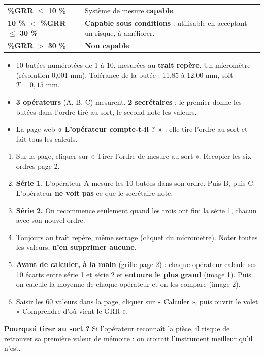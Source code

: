 \documentclass[10pt,a4paper]{article}
\begin{document}
\renewcommand{\arraystretch}{1.2}
\begin{tabularx}{\linewidth}{@{}l X@{}}
\toprule
\textcolor{ok}{\textbf{\%GRR $\le$ 10 \%}} & Système de mesure \textbf{capable}.\\
\textbf{10 \% $<$ \%GRR $\le$ 30 \%} & \textbf{Capable sous conditions} : utilisable en acceptant un risque, à améliorer.\\
\textcolor{ko}{\textbf{\%GRR $>$ 30 \%}} & \textbf{Non capable}.\\
\bottomrule
\end{tabularx}

\begin{itemize}
\item 10 butées numérotées de 1 à 10, mesurées au \textbf{trait repère}. Un micromètre (résolution 0,001 mm). Tolérance de la butée : 11,85 à 12,00 mm, soit $T = 0{,}15$ mm.
\item \textbf{3 opérateurs} (A, B, C) mesurent. \textbf{2 secrétaires} : le premier donne les butées dans l'ordre tiré au sort, le second note les valeurs.
\item La page web \textbf{« L'opérateur compte-t-il ? »} : elle tire l'ordre au sort et fait tous les calculs.
\end{itemize}

\begin{enumerate}[label=\textcolor{cyan}{\textbf{\arabic*.}},leftmargin=15pt]
\item Sur la page, cliquer sur « Tirer l'ordre de mesure au sort ». Recopier les six ordres page 2.
\item \textbf{Série 1.} L'opérateur A mesure les 10 butées dans son ordre. Puis B, puis C. L'opérateur \textbf{ne voit pas} ce que le secrétaire note.
\item \textbf{Série 2.} On recommence seulement quand les trois ont fini la série 1, chacun avec son nouvel ordre.
\item Toujours au trait repère, même serrage (cliquet du micromètre). Noter toutes les valeurs, \textbf{n'en supprimer aucune}.
\item \textbf{Avant de calculer, à la main} (grille page 2) : chaque opérateur calcule ses 10 écarts entre série 1 et série 2 et \textbf{entoure le plus grand} (image 1). Puis on calcule la moyenne de chaque opérateur et on les compare (image 2).
\item Saisir les 60 valeurs dans la page, cliquer sur « Calculer », puis ouvrir le volet « Comprendre d'où vient le GRR ».
\end{enumerate}
{\small\textbf{Pourquoi tirer au sort ?} Si l'opérateur reconnaît la pièce, il risque de retrouver sa première valeur de mémoire : on croirait l'instrument meilleur qu'il n'est.}
\end{document}

